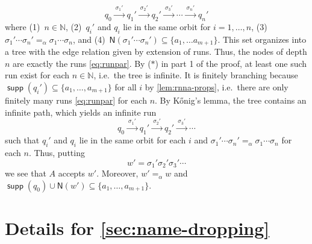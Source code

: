 \documentclass[10pt,a4paper]{amsart}
\newcommand{\Names}[1]{\mathsf{N}(#1)}
\numberwithin{equation}{section}
\newcommand{\xto}[1]{\xrightarrow{~#1~}}
\newcommand{\seq}{\subseteq}
\newcommand{\Nat}{{\mathbb{N}}}
\newcommand{\+}[1]{\mathcal{#1}\xspace}
\DeclareMathOperator{\supp}{\mathsf{supp}} %
\theoremstyle{definition}
\begin{document}
\begin{enumerate}
  \begin{equation}\label{eq:runpar}
    q_0 \xto{\sigma_1'} q_1' \xto{\sigma_2'} q_2' \xto{\sigma_3'} \cdots
    \xto{\sigma_n'} q_n'
  \end{equation}
  where (1)~$n\in \Nat$, (2)~$q_i'$ and $q_i$ lie in the same orbit
  for $i=1,\ldots, n$, (3)~$\sigma_1'\cdots \sigma_n' =_\alpha \sigma_1\cdots \sigma_n$, and
  (4)~$\Names{\sigma_1'\cdots \sigma_n'}\seq \{a_1,\ldots
  a_{m+1}\}$. This set organizes into a tree with the edge relation
  given by extension of runs. Thus, the nodes of depth $n$ are exactly
  the runs \eqref{eq:runpar}. By ($\ast$) in part 1 of the proof, at least one
  such run exist for each $n\in \Nat$, i.e.~the tree is infinite. It
  is finitely branching because
  $\supp(q_i')\seq \{a_1,\ldots, a_{m+1}\}$ for all $i$ by \autoref{lem:rnna-props}, i.e.~there
  are only finitely many runs \eqref{eq:runpar} for each $n$. By
  K\H{o}nig's
  lemma, the tree contains an infinite path, which yields an infinite run
  \[
    q_0 \xto{\sigma_1'} q_1' \xto{\sigma_2'} q_2' \xto{\sigma_3'}
    \cdots
  \]
  such that $q_i'$ and $q_i$ lie in the same orbit for each $i$ and
  $\sigma_1'\cdots \sigma_n'=_\alpha \sigma_1\cdots \sigma_n$ for each
  $n$. Thus, putting
  \[
    w'= \sigma_1'\sigma_2'\sigma_3'\cdots
  \]
  we see that $A$ accepts $w'$. Moreover, $w'=_\alpha w$ and
  $\supp(q_0)\cup \Names{w'}\seq \{a_1,\ldots, a_{m+1}\}$. %
\end{enumerate}

\section{Details for \autoref{sec:name-dropping}}
\end{document}
